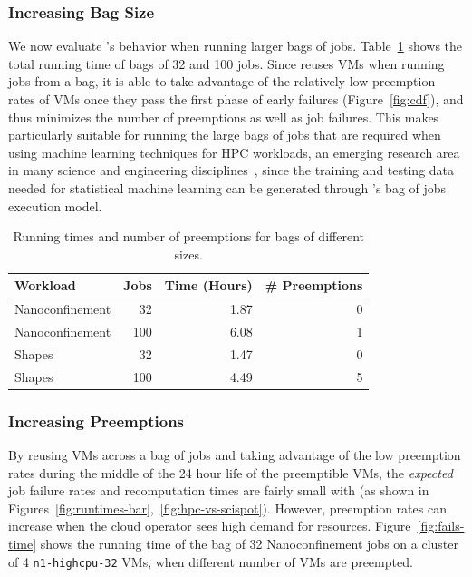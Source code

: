 \subsubsection{Increasing Bag Size}

We now evaluate \sysname's behavior when running larger bags of jobs.
Table~\ref{tab:100-jobs} shows the total running time of bags of 32 and 100 jobs.
Since \sysname reuses VMs when running jobs from a bag, it is able to take advantage of the relatively low preemption rates of VMs once they pass the first phase of early failures (Figure~\ref{fig:cdf}), and thus minimizes the number of preemptions as well as job failures. 
This makes \sysname particularly suitable for running the large bags of jobs that are required when using machine learning techniques for HPC workloads, an emerging research area in many science and engineering disciplines~\cite{ml.atomic2017,melko2017,sam2017,fu2017,long2015machine,ferguson2017machine,ward2018matminer,jcs1,jcs2,fox2019learning}, since the training and testing data needed for statistical machine learning can be generated through \sysname's bag of jobs execution model. 


\begin{table}
  \begin{tabular}{|l|r|r|r|}
    \hline
    Workload & Jobs & Time (Hours) & \# Preemptions \\
    \hline
    Nanoconfinement & 32  & 1.87 & 0 \\
    Nanoconfinement & 100  & 6.08 & 1 \\
    \hline
    Shapes & 32 & 1.47 & 0 \\
    Shapes & 100 & 4.49 & 5  \\  
    \hline
  \end{tabular}
  \caption{Running times and number of preemptions for bags of different sizes. }
  \label{tab:100-jobs}
  \vspace*{\myfigspace}
\end{table}




\subsubsection{Increasing Preemptions}

By reusing VMs across a bag of jobs and taking advantage of the low preemption rates during the middle of the 24 hour life of the preemptible VMs, the \emph{expected} job failure rates and recomputation times are fairly small with \sysname (as shown in Figures~\ref{fig:runtimes-bar},~\ref{fig:hpc-vs-scispot}).
However, preemption rates can increase when the cloud operator sees high demand for resources.
Figure~\ref{fig:fails-time} shows the running time of the bag of 32 Nanoconfinement jobs on a cluster of 4 \texttt{n1-highcpu-32} VMs, when different number of VMs are preempted. 

